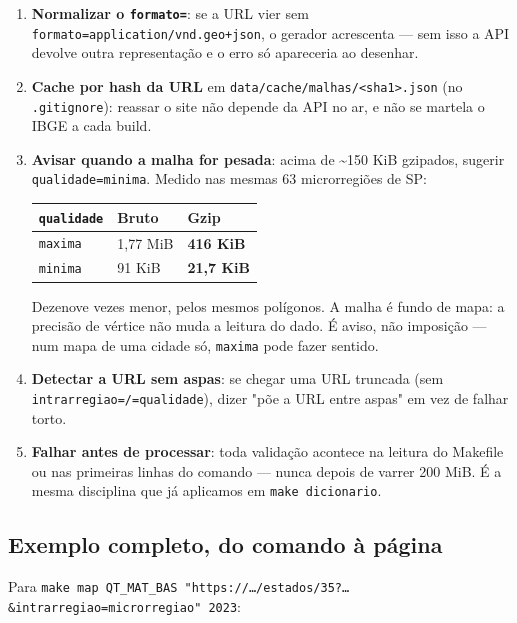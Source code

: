 \documentclass[11pt]{article}
\begin{document}
\begin{enumerate}
\item \textbf{Normalizar o \texttt{formato=}}: se a URL vier sem
\texttt{formato=application/vnd.geo+json}, o gerador acrescenta — sem isso a API
devolve outra representação e o erro só apareceria ao desenhar.
\item \textbf{Cache por hash da URL} em \texttt{data/cache/malhas/<sha1>.json} (no
\texttt{.gitignore}): reassar o site não depende da API no ar, e não se martela
o IBGE a cada build.
\item \textbf{Avisar quando a malha for pesada}: acima de \textasciitilde{}150 KiB gzipados, sugerir
\texttt{qualidade=minima}. Medido nas mesmas 63 microrregiões de SP:

\begin{center}
\begin{tabular}{lll}
\texttt{qualidade} & Bruto & Gzip\\
\hline
\texttt{maxima} & 1,77 MiB & \textbf{416 KiB}\\
\texttt{minima} & 91 KiB & \textbf{21,7 KiB}\\
\end{tabular}
\end{center}

Dezenove vezes menor, pelos mesmos polígonos. A malha é fundo de mapa: a
precisão de vértice não muda a leitura do dado. É aviso, não imposição —
num mapa de uma cidade só, \texttt{maxima} pode fazer sentido.
\item \textbf{Detectar a URL sem aspas}: se chegar uma URL truncada (sem
\texttt{intrarregiao=/=qualidade}), dizer "põe a URL entre aspas" em vez de
falhar torto.
\item \textbf{Falhar antes de processar}: toda validação acontece na leitura do
Makefile ou nas primeiras linhas do comando — nunca depois de varrer
200 MiB. É a mesma disciplina que já aplicamos em \texttt{make dicionario}.
\end{enumerate}
\subsection{Exemplo completo, do comando à página}
\label{sec:org8c48921}

Para \texttt{make map QT\_MAT\_BAS "https://…/estados/35?…\&intrarregiao=microrregiao" 2023}:
\end{document}

